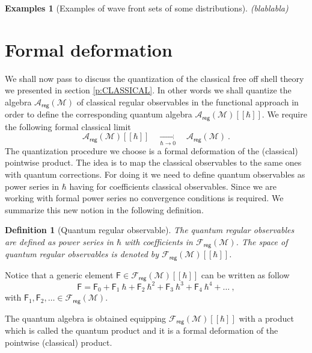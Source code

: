 \documentclass[11pt]{book}
\newcommand{\hilight}[1]{\colorbox{yellow!80!black}{#1}}
\newcommand{\reg}{\mathsf{reg}}
\newcommand{\Acal}{\mathcal{A}}
\newcommand{\Fcal}{\mathcal{F}}
\newcommand{\Mcal}{\mathcal{M}}
\newcommand{\Fsf}{\mathsf{F}}
\theoremstyle{break}
\newtheorem{examples}{Examples}[chapter]
\newtheorem{definition}{Definition}[chapter]
\begin{document}
\begin{examples}[Examples of wave front sets of some distributions]
\hilight{(blablabla)}
\end{examples}


\section{Formal deformation}
\label{p:Q_DEFORM}


We shall now pass to discuss the quantization of the classical free off shell theory we presented in section \ref{p:CLASSICAL}. In other words we shall quantize the algebra $\Acal_\reg(\Mcal)$ of classical regular observables in the functional approach in order to define the corresponding quantum algebra $\Acal_\reg(\Mcal)[[\hbar]]$. We require the following formal classical limit
%
\begin{equation*}
\Acal_\reg(\Mcal)[[\hbar]] \quad \underset{\hbar \to 0}{\longrightarrow} \quad \Acal_\reg(\Mcal) \ . 
\end{equation*}
%
The quantization procedure we choose is a formal deformation of the (classical) pointwise product. The idea is to map the classical observables to the same ones with quantum corrections. For doing it we need to define quantum observables as power series in $\hbar$ having for coefficients classical observables. Since we are working with formal power series no convergence conditions is required. We summarize this new notion in the following definition.


\begin{definition}[Quantum regular observable]\label{def:obs_reg_q}
The quantum regular observables are defined as power series in $\hbar$ with coefficients in $\Fcal_\reg(\Mcal)$. The space of quantum regular observables is denoted by $\Fcal_\reg(\Mcal)[[\hbar]]$.
\end{definition}

Notice that a generic element $\Fsf \in \Fcal_\reg(\Mcal)[[\hbar]]$ can be written as follow
%
\begin{equation*}
\Fsf = \Fsf_0 + \Fsf_1 \ \hbar + \Fsf_2 \ \hbar^2 + \Fsf_3 \ \hbar^3 + \Fsf_4 \ \hbar^4 + \dots \ ,
\end{equation*}
%
with $\Fsf_1, \Fsf_2, \dots \in \Fcal_\reg(\Mcal)$. 


The quantum algebra is obtained equipping $\Fcal_\reg(\Mcal)[[\hbar]]$ with a product which is called the quantum product and it is a formal deformation of the pointwise (classical) product.
\end{document}
